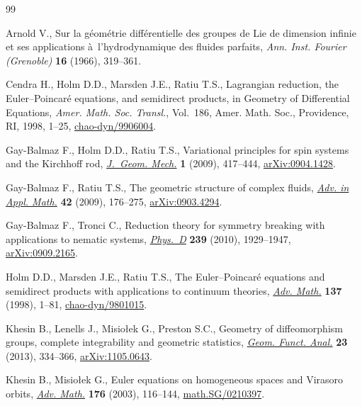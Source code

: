 \documentclass[10pt,a4paper]{amsart}
\numberwithin{equation}{section}
\begin{document}
\begin{thebibliography}{99}
\footnotesize \itemsep=-0.5pt

Arnold V., Sur la g\'eom\'etrie dif\/f\'erentielle des groupes de {L}ie de
  dimension inf\/inie et ses applications \`a~l'hydrodynamique des f\/luides
  parfaits, \textit{Ann. Inst. Fourier (Grenoble)} \textbf{16} (1966),
  319--361.

Cendra H., Holm D.D., Marsden J.E., Ratiu T.S., Lagrangian reduction, the
  {E}uler--{P}oincar\'e equations, and semidirect products, in Geometry of
  Dif\/ferential Equations, \textit{Amer. Math. Soc. Transl.}, Vol.~186, Amer.
  Math. Soc., Providence, RI, 1998, 1--25, \href{http://arxiv.org/abs/chao-dyn/9906004}{chao-dyn/9906004}.

Gay-Balmaz F., Holm D.D., Ratiu T.S., Variational principles for spin systems
  and the {K}irchhof\/f rod, \href{http://dx.doi.org/10.3934/jgm.2009.1.417}{\textit{J.~Geom. Mech.}} \textbf{1} (2009), 417--444,
  \href{http://arxiv.org/abs/0904.1428}{arXiv:0904.1428}.

Gay-Balmaz F., Ratiu T.S., The geometric structure of complex f\/luids,
  \href{http://dx.doi.org/10.1016/j.aam.2008.06.002}{\textit{Adv. in Appl. Math.}} \textbf{42} (2009), 176--275,
  \href{http://arxiv.org/abs/0903.4294}{arXiv:0903.4294}.

Gay-Balmaz F., Tronci C., Reduction theory for symmetry breaking with
  applications to nematic systems, \href{http://dx.doi.org/10.1016/j.physd.2010.07.002}{\textit{Phys.~D}} \textbf{239} (2010),
  1929--1947, \href{http://arxiv.org/abs/0909.2165}{arXiv:0909.2165}.

Holm D.D., Marsden J.E., Ratiu T.S., The {E}uler--{P}oincar\'e equations and
  semidirect products with applications to continuum theories, \href{http://dx.doi.org/10.1006/aima.1998.1721}{\textit{Adv.
  Math.}} \textbf{137} (1998), 1--81, \href{http://arxiv.org/abs/chao-dyn/9801015}{chao-dyn/9801015}.

Khesin B., Lenells J., Misio{\l}ek G., Preston S.C., Geometry of dif\/feomorphism
  groups, complete integrability and geometric statistics, \href{http://dx.doi.org/10.1007/s00039-013-0210-2}{\textit{Geom. Funct.
  Anal.}} \textbf{23} (2013), 334--366, \href{http://arxiv.org/abs/1105.0643}{arXiv:1105.0643}.

Khesin B., Misio{\l}ek G., Euler equations on homogeneous spaces and {V}irasoro
  orbits, \href{http://dx.doi.org/10.1016/S0001-8708(02)00063-4}{\textit{Adv. Math.}} \textbf{176} (2003), 116--144,
  \href{http://arxiv.org/abs/math.SG/0210397}{math.SG/0210397}.


\end{thebibliography}
\end{document}
